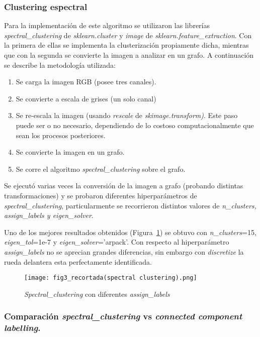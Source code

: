 \documentclass[journal,article,submit,pdftex,moreauthors]{Definitions/mdpi}
\begin{document}
\subsubsection{Clustering espectral}

Para la implementación de este algoritmo se utilizaron las librerías \textit{spectral\_clustering} de \textit{sklearn.cluster} y \textit{image} de \textit{sklearn.feature\_extraction}. Con la primera de ellas se implementa la clusterización propiamente dicha, mientras que con la segunda se convierte la imagen a analizar en un grafo. A continuación se describe la metodología utilizada:
\begin{enumerate}[leftmargin=2cm]
    \item Se carga la imagen RGB (posee tres canales).
    \item Se convierte a escala de grises (un solo canal)
    \item Se re-escala la imagen (usando \textit{rescale} de \textit{skimage.transform)}. Este paso puede ser o no necesario, dependiendo de lo costoso computacionalmente que sean los procesos posteriores.
    \item Se convierte la imagen en un grafo.
    \item Se corre el algoritmo \textit{spectral\_clustering} sobre el grafo.\end{enumerate}

Se ejecutó varias veces la conversión de la imagen a grafo (probando distintas transformaciones) y se probaron
diferentes hiperparámetros de \textit{spectral\_clustering}, particularmente se recorrieron distintos valores de \textit{n\_clusters\textnormal{,} 
 assign\_labels \textnormal{y} eigen\_solver}.

Uno de los mejores resultados obtenidos (Figura~\ref{spectral_clustering}) se obtuvo con \textit{n\_clusters}=15,  \textit{eigen\_tol}=1e-7 \textnormal{y} \textit{eigen\_solver}='arpack'. Con respecto al hiperparámetro  \textit{assign\_labels} no se aprecian grandes diferencias, sin embargo con \textit{discretize} la rueda delantera esta perfectamente identificada.

\begin{figure}[H]
\texttt{[image: fig3\_recortada(spectral clustering).png]}
\captionsetup{justification=centering}
\caption{\textit{Spectral\_clustering} con diferentes \textit{assign\_labels} \label{spectral_clustering}}
\end{figure}   
\skip

\subsubsection{Comparación \textit{spectral\_clustering} vs \textit{connected component labelling}.}
\end{document}
